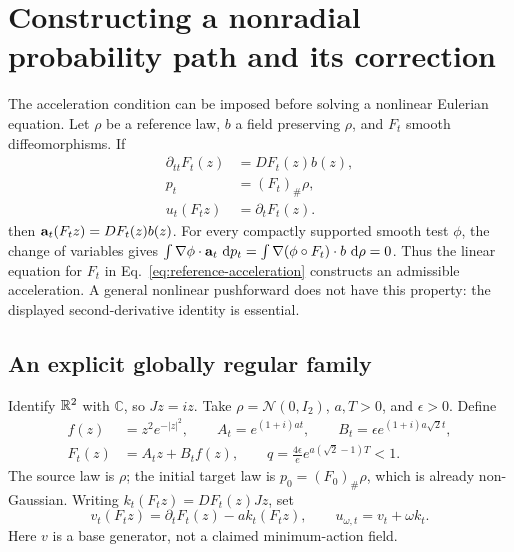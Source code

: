 \section{Constructing a nonradial probability path and its correction}
\label{sec:nonradial-construction}

The acceleration condition can be imposed before solving a nonlinear
Eulerian equation. Let $\rho$ be a reference law, $b$ a field preserving
$\rho$, and $F_t$ smooth diffeomorphisms. If
\begin{equation}
 \begin{aligned}
  \partial_{tt}F_t(z)&=D F_t(z)b(z),\\
  p_t&=(F_t)_\#\rho,\\
  u_t(F_tz)&=\partial_tF_t(z).
 \end{aligned}
 \label{eq:reference-acceleration}
\end{equation}
then $\mathbf a_t(F_tz)=DF_t(z)b(z)$. For every compactly supported smooth test
$\phi$, the change of variables gives
$\int\nabla\phi\cdot\mathbf a_t\,\,\mathrm d p_t
=\int\nabla(\phi\circ F_t)\cdot b\,\,\mathrm d\rho=0$.
Thus the linear equation for $F_t$ in
Eq.~\eqref{eq:reference-acceleration} constructs an admissible acceleration.
A general nonlinear pushforward does not have this property: the displayed
second-derivative identity is essential.

\subsection{An explicit globally regular family}

Identify $\mathbb R^2$ with $\mathbb C$, so $Jz=iz$. Take
$\rho=\mathcal N(0,I_2)$, $a,T>0$, and $\epsilon>0$. Define
\begin{align}
 f(z)&=z^2e^{-|z|^2},\qquad
 A_t=e^{(1+i)at},\qquad B_t=\epsilon e^{(1+i)a\sqrt2t},\nonumber\\
 F_t(z)&=A_tz+B_tf(z),\qquad
 q=\frac{4\epsilon}{e}e^{a(\sqrt2-1)T}<1.
 \label{eq:harmonic-map}
\end{align}
The source law is $\rho$; the initial target law is $p_0=(F_0)_\#\rho$,
which is already non-Gaussian. Writing
$k_t(F_tz)=DF_t(z)Jz$, set
\begin{equation}
 v_t(F_tz)=\partial_tF_t(z)-a k_t(F_tz),\qquad
 u_{\omega,t}=v_t+\omega k_t.
 \label{eq:harmonic-gauge}
\end{equation}
Here $v$ is a base generator, not a claimed minimum-action field.

